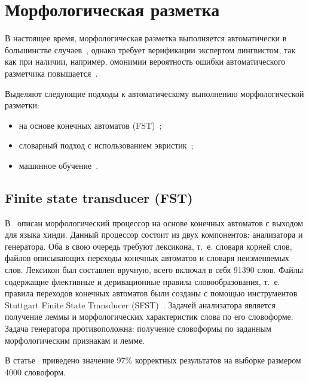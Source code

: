 \section{Морфологическая разметка}

В настоящее время, морфологическая разметка выполняется автоматически в большинстве случаев~\cite{butenko2025modeli}, однако требует верификации экспертом лингвистом, так как при наличии, например, омонимии вероятность ошибки автоматического разметчика повышается~\cite{komendantov2019avtomatizaciya}.

Выделяют следующие подходы к автоматическому выполнению морфологической разметки:
\begin{itemize}
	\item на основе конечных автоматов (FST)~\cite{chandia2022fstmorphologicalanalysergenerator, kumar2012fst, strunk2020};
	\item словарный подход с использованием эвристик~\cite{segalovich2003fast,StemkaWebsite,PorterStemmer2001,Pymorphy2Internals};
	\item машинное обучение~\cite{Petrochenkov2013}.
\end{itemize}

\subsection{Finite state transducer (FST)}

В~\cite{kumar2012fst} описан морфологический процессор на основе конечных автоматов с выходом для языка хинди. Данный процессор состоит из двух компонентов: анализатора и генератора. Оба в свою очередь требуют лексикона, т.~е. словаря корней слов, файлов описывающих переходы конечных автоматов и словаря неизменяемых слов. Лексикон был составлен вручную, всего включал в себя 91390 слов. Файлы содержащие флективные и деривационные правила словообразования, т.~е. правила переходов конечных автоматов были созданы с помощью инструментов Stuttgart Finite State Transducer (SFST)~\cite{schmidSFSTmanual}. Задачей анализатора является получение леммы и морфологических характеристик слова по его словоформе. Задача генератора противоположна: получение словоформы по заданным морфологическим признакам и лемме.

В статье~\cite{kumar2012fst} приведено значение 97\% корректных результатов на выборке размером 4000 словоформ.

